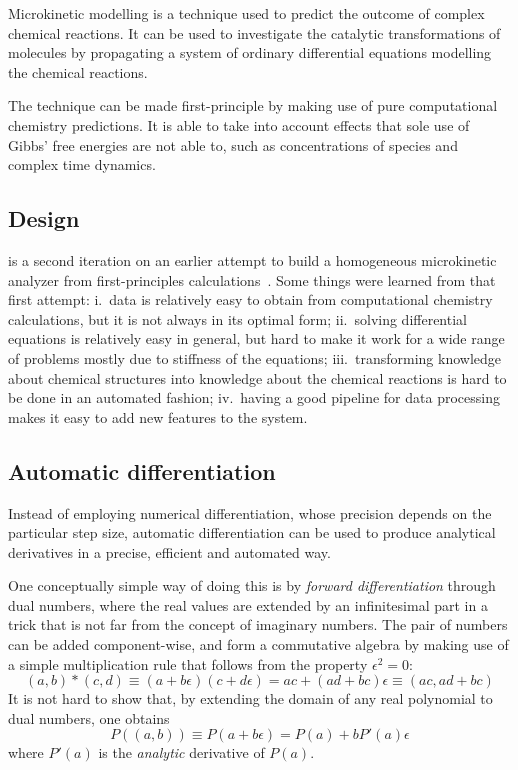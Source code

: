 Microkinetic modelling is a technique used to predict the outcome of complex
chemical reactions.
It can be used to investigate the catalytic transformations of molecules by
propagating a system of ordinary differential equations modelling the chemical
reactions.

The technique can be made first-principle by making use of pure computational
chemistry predictions.
It is able to take into account effects that sole use of Gibbs' free energies
are not able to, such as concentrations of species and complex time dynamics.

\subsection{Design}

\overreact is a second iteration on an earlier attempt to build a
homogeneous microkinetic analyzer from first-principles
calculations~\cite{pyrrole2019zenodo}.
Some things were learned from that first attempt:
i.\ data is relatively easy to obtain from computational chemistry calculations,
but it is not always in its optimal form;
ii.\ solving differential equations is relatively easy in general, but hard to
make it work for a wide range of problems mostly due to stiffness of the
equations;
iii.\ transforming knowledge about chemical structures into knowledge about the
chemical reactions is hard to be done in an automated fashion;
iv.\ having a good pipeline for data processing makes it easy to add new
features to the system.

\subsection{Automatic differentiation}

Instead of employing numerical differentiation, whose precision depends on the
particular step size, automatic differentiation can be used to produce
analytical derivatives in a precise, efficient and automated way.

One conceptually simple way of doing this is by \emph{forward differentiation}
through dual numbers, where the real values are extended by an infinitesimal
part in a trick that is not far from the concept of imaginary numbers.
The pair of numbers can be added component-wise, and form a commutative algebra
by making use of a simple multiplication rule that follows from the property
$\epsilon^2 = 0$:
\begin{equation}
	(a, b) * (c, d)
	\equiv (a + b\epsilon)(c + d\epsilon)
	= a c + (a d + b c)\epsilon
	\equiv (a c, a d + b c)
\end{equation}
It is not hard to show that, by extending the domain of any real polynomial to
dual numbers, one obtains
\begin{equation}
	P((a, b)) \equiv P(a + b\epsilon) = P(a) + b P'(a) \epsilon
\end{equation}
where $P'(a)$ is the \emph{analytic} derivative of $P(a)$.

